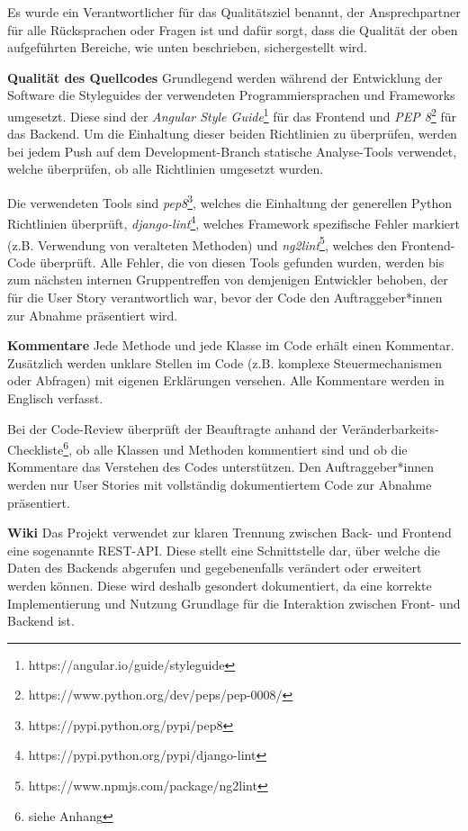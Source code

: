 \documentclass[accentcolor=tud0b,12pt,paper=a4]{tudreport}
\begin{document}
Es wurde ein Verantwortlicher für das Qualitätsziel benannt, der Ansprechpartner für alle Rücksprachen oder Fragen ist und dafür sorgt, dass die Qualität der oben aufgeführten Bereiche, wie unten beschrieben, sichergestellt wird.

\textbf{Qualität des Quellcodes}
Grundlegend werden während der Entwicklung der Software die Styleguides der verwendeten Programmiersprachen und Frameworks umgesetzt. Diese sind der \emph{Angular Style Guide}\footnote{https://angular.io/guide/styleguide} für das Frontend und \emph{PEP 8}\footnote{https://www.python.org/dev/peps/pep-0008/} für das Backend. Um die Einhaltung dieser beiden Richtlinien zu überprüfen, werden bei jedem Push auf dem Development-Branch statische Analyse-Tools verwendet, welche überprüfen, ob alle Richtlinien umgesetzt wurden.

Die verwendeten Tools sind \emph{pep8}\footnote{https://pypi.python.org/pypi/pep8}, welches die Einhaltung der generellen Python Richtlinien überprüft, \emph{django-lint}\footnote{https://pypi.python.org/pypi/django-lint}, welches Framework spezifische Fehler markiert (z.B. Verwendung von veralteten Methoden) und \emph{ng2lint}\footnote{https://www.npmjs.com/package/ng2lint}, welches den Frontend-Code überprüft. Alle Fehler, die von diesen Tools gefunden wurden, werden bis zum nächsten internen Gruppentreffen von demjenigen Entwickler behoben, der für die User Story verantwortlich war, bevor der Code den Auftraggeber*innen zur Abnahme präsentiert wird.

\textbf{Kommentare}
Jede Methode und jede Klasse im Code erhält einen Kommentar. Zusätzlich werden unklare Stellen im Code (z.B. komplexe Steuermechanismen oder Abfragen) mit eigenen Erklärungen versehen. Alle Kommentare werden in Englisch verfasst.

Bei der Code-Review überprüft der Beauftragte anhand der Veränderbarkeits-Checkliste\footnote{siehe Anhang}, ob alle Klassen und Methoden kommentiert sind und ob die Kommentare das Verstehen des Codes unterstützen. Den Auftraggeber*innen werden nur User Stories mit vollständig dokumentiertem Code zur Abnahme präsentiert.

\textbf{Wiki}
Das Projekt verwendet zur klaren Trennung zwischen Back- und Frontend eine sogenannte REST-API. Diese stellt eine Schnittstelle dar, über welche die Daten des Backends abgerufen und gegebenenfalls verändert oder erweitert werden können. Diese wird deshalb gesondert dokumentiert, da eine korrekte Implementierung und Nutzung Grundlage für die Interaktion zwischen Front- und Backend ist.
\end{document}
